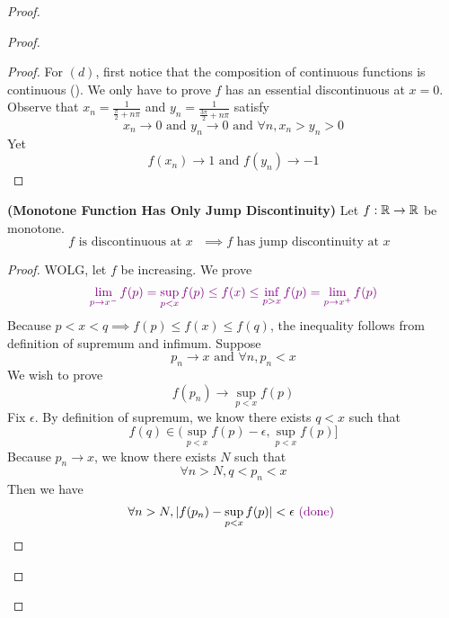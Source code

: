 \documentclass{report}
\begin{document}
\begin{proof}
\begin{proof}
\begin{proof}
For $(d)$, first notice that the composition of continuous functions is continuous (). We only have to prove $f$ has an essential discontinuous at $x=0$.\\

Observe that  $x_n=\frac{1}{\frac{\pi}{2}+n \pi}$ and $y_n=\frac{1}{\frac{3\pi}{2}+n \pi}$ satisfy
\begin{equation*}
x_n\to 0\text{ and }y_n\to 0\text{ and }\forall n,x_n>y_n>0
\end{equation*}
Yet 
\begin{equation*}
f(x_n)\to 1\text{ and }f(y_n)\to -1
\end{equation*}
\end{proof}
\begin{theorem}
\label{3.11.16}
\textbf{(Monotone Function Has Only Jump Discontinuity)} Let $f:\mathbb{R}\rightarrow \mathbb{R}$ be monotone.
\begin{equation*}
f\text{ is discontinuous at $x$ }\implies f\text{ has jump discontinuity at $x$ }
\end{equation*}
\end{theorem}
\begin{proof}
WOLG, let $f$ be increasing. We prove 
\begin{equation*}
\textcolor{violet}{\lim_{p\to x^-}f(p)=\sup_{p<x} f(p)\leq f(x)\leq \inf_{p>x}f(p)=\lim_{p\to x^+}f(p)}
\end{equation*}
Because $p<x<q\implies f(p)\leq f(x)\leq f(q)$, the inequality follows from definition of supremum and infimum. Suppose
\begin{equation*}
p_n\to x\text{ and }\forall n,p_n<x
\end{equation*}
We wish to prove 
\begin{equation*}
f(p_n)\to \sup_{p<x}f(p)
\end{equation*}
Fix $\epsilon $. By definition of supremum, we know there exists $q<x$ such that 
 \begin{equation*}
   f(q)\in (\sup_{p<x}f(p)-\epsilon ,\sup_{p<x}f(p)]
\end{equation*}
Because $p_n\to x$, we know there exists $N$ such that 
 \begin{equation*}
\forall n>N, q<p_n<x
\end{equation*}
Then we have
\begin{equation*}
\forall n>N, \abso{f(p_n)-\sup_{p<x}f(p)}<\epsilon \vdone

\end{equation*}
\end{proof}
\end{proof}
\end{proof}
\end{document}
